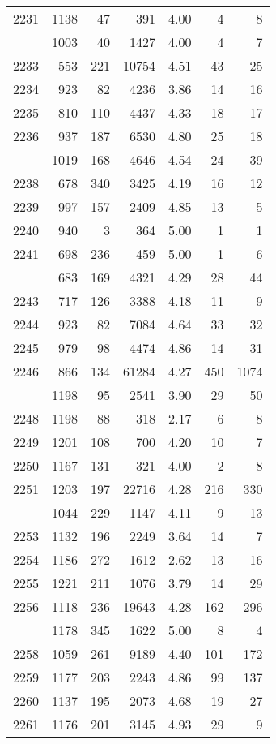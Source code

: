 \documentclass[
]{article}
\begin{document}
\begin{table}
\begin{tabular}[t]{lrrrrrr}
2231 & 1138 & 47 & 391 & 4.00 & 4 & 8\\
\addlinespace
2232 & 1003 & 40 & 1427 & 4.00 & 4 & 7\\
2233 & 553 & 221 & 10754 & 4.51 & 43 & 25\\
2234 & 923 & 82 & 4236 & 3.86 & 14 & 16\\
2235 & 810 & 110 & 4437 & 4.33 & 18 & 17\\
2236 & 937 & 187 & 6530 & 4.80 & 25 & 18\\
\addlinespace
2237 & 1019 & 168 & 4646 & 4.54 & 24 & 39\\
2238 & 678 & 340 & 3425 & 4.19 & 16 & 12\\
2239 & 997 & 157 & 2409 & 4.85 & 13 & 5\\
2240 & 940 & 3 & 364 & 5.00 & 1 & 1\\
2241 & 698 & 236 & 459 & 5.00 & 1 & 6\\
\addlinespace
2242 & 683 & 169 & 4321 & 4.29 & 28 & 44\\
2243 & 717 & 126 & 3388 & 4.18 & 11 & 9\\
2244 & 923 & 82 & 7084 & 4.64 & 33 & 32\\
2245 & 979 & 98 & 4474 & 4.86 & 14 & 31\\
2246 & 866 & 134 & 61284 & 4.27 & 450 & 1074\\
\addlinespace
2247 & 1198 & 95 & 2541 & 3.90 & 29 & 50\\
2248 & 1198 & 88 & 318 & 2.17 & 6 & 8\\
2249 & 1201 & 108 & 700 & 4.20 & 10 & 7\\
2250 & 1167 & 131 & 321 & 4.00 & 2 & 8\\
2251 & 1203 & 197 & 22716 & 4.28 & 216 & 330\\
\addlinespace
2252 & 1044 & 229 & 1147 & 4.11 & 9 & 13\\
2253 & 1132 & 196 & 2249 & 3.64 & 14 & 7\\
2254 & 1186 & 272 & 1612 & 2.62 & 13 & 16\\
2255 & 1221 & 211 & 1076 & 3.79 & 14 & 29\\
2256 & 1118 & 236 & 19643 & 4.28 & 162 & 296\\
\addlinespace
2257 & 1178 & 345 & 1622 & 5.00 & 8 & 4\\
2258 & 1059 & 261 & 9189 & 4.40 & 101 & 172\\
2259 & 1177 & 203 & 2243 & 4.86 & 99 & 137\\
2260 & 1137 & 195 & 2073 & 4.68 & 19 & 27\\
2261 & 1176 & 201 & 3145 & 4.93 & 29 & 9\\

\end{tabular}
\end{table}
\end{document}
